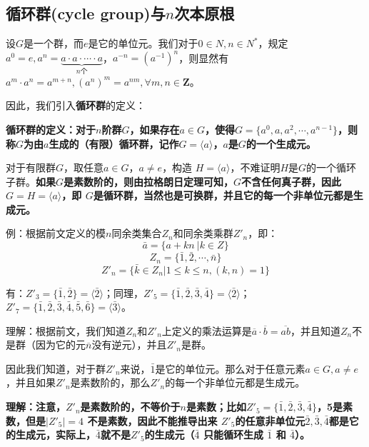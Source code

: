 \documentclass[12pt]{article}
\begin{document}
\subsection{循环群(cycle group)与$n$次本原根}
设$G$是一个群，而$e$是它的单位元。我们对于$0 \in N, n \in N^*$，规定 $a^0 = e, a^n = \underbrace{a\cdot a \cdot \cdots \cdot a}_{n\text{个}}$，$a^{-n} = (a^{-1})^n$，则显然有$a^m \cdot a^n = a^{m+n}, (a^n)^m = a^{nm}, \forall m, n \in \mathbf{Z}$。

因此，我们引入\textbf{循环群}的定义：
\begin{mdframed}[
linecolor=black!40,outerlinewidth=1pt,roundcorner=.5em,innertopmargin=1ex,innerbottommargin=.5\baselineskip,innerrightmargin=1em,innerleftmargin=1em,backgroundcolor=gray!5,
]
\textbf{
循环群的定义：对于$n$阶群$G$，如果存在$a \in G$，使得$G = \{a^0, a, a^2, \cdots, a^{n-1}\}$，则称$G$为由$a$生成的（有限）循环群，记作$G = \langle a \rangle$，$a$是$G$的一个生成元。
}
\end{mdframed}

对于有限群$G$，取任意$a \in G$，$a \neq e$，构造 $H = \langle a \rangle$，不难证明$H$是$G$的一个循环子群。\textbf{如果$G$是素数阶的，则由拉格朗日定理可知，$G$不含任何真子群，因此$G = H = \langle a \rangle$，即
$G$是循环群，当然也是可换群，并且它的每一个非单位元都是生成元。}

\begin{framed}
例：根据前文定义的模$n$同余类集合$Z_n$和同余类乘群$Z'_n$，即：
$$
\bar{a} = \{a + kn\ | k \in Z\}
$$
$$
Z_n = \{\bar{1}, \bar{2}, \cdots, \bar{n}\}
$$
$$
Z'_n = \{\bar{k} \in Z_n | 1 \le k \le n, (k,n) = 1\}
$$

有：$Z'_3 = \{\bar{1}, \bar{2}\} = \langle\bar{2}\rangle $；同理，$Z'_5 = \{\bar{1}, \bar{2}, \bar{3}, \bar{4}\} = \langle\bar{2}\rangle$；$Z'_7 = \{\bar{1}, \bar{2}, \bar{3}, \bar{4}, \bar{5}, \bar{6}\} = \langle\bar{3}\rangle$。

理解：根据前文，我们知道$Z_n$和$Z'_n$上定义的乘法运算是$\overline{a}\cdot \overline{b} = \overline{ab}$，并且知道$Z_n$不是群（因为它的元$\overline{n}$没有逆元），并且$Z'_n$是群。

因此我们知道，对于群$Z'_n$来说，$\bar{1}$是它的单位元。那么对于任意元素$a \in G, a \neq e$，并且如果$Z'_n$是素数阶的，那么$Z'_n$的每一个非单位元都是生成元。

\textbf{
理解：注意，$Z'_n$是素数阶的，不等价于$n$是素数；比如$Z'_5 = \{\bar{1}, \bar{2}, \bar{3}, \bar{4}\} $，5是素数，但是$|Z'_5| = 4$ 不是素数，因此不能推导出来 $Z'_5$的任意非单位元$\bar{2}, \bar{3}, \bar{4}$都是它的生成元，实际上，$\bar{4}$就不是$Z'_5$的生成元（$\bar{4}$ 只能循环生成 $\bar{1}$ 和 $\bar{4}$）。
}
\end{framed}
\end{document}
